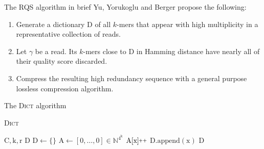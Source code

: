\documentclass[12pt]{beamer}
\newcommand{\pp}{\nolinebreak\hspace{-.05em}\raisebox{.4ex}{\tiny\bf +}\nolinebreak\raisebox{.4ex}{\tiny\bf +}\xspace}
\begin{document}
    \begin{frame}{The RQS algorithm in brief}
        Yu, Yorukoglu and Berger \cite{YYB14} propose the following:

        \vspace{0.25cm}

        \begin{enumerate}
            \item Generate a dictionary \(\text{D}\) of all \(k\)-mers that appear
                with high multiplicity in a representative collection of reads.
            \item Let \(\gamma\) be a read. Its \(k\)-mers close to \(\text{D}\) in
                Hamming distance have nearly all of their quality score discarded.
            \item Compress the resulting high redundancy sequence with a general
                purpose lossless compression algorithm.
        \end{enumerate}
    \end{frame}

    \begin{frame}{The \textsc{Dict} algorithm}
        \begin{algorithm}[H]
            \caption{\textsc{Dict}}
            \begin{algorithmic}[1]
                \REQUIRE \(\text{C}, \text{k}, \text{r}\)
                \ENSURE \(\text{D}\)
                \STATE \(\text{D} \leftarrow \{\}\)
                \STATE \(\text{A} \leftarrow [0,\dots,0] \in \mathbb{N}^{4^\text{k}}\)
                    \STATE \(\text{A}[\text{x}]\pp\)
                \ENDFOR
                        \STATE \(\text{D}.\text{append}(\text{x})\)
                    \ENDIF
                \ENDFOR
                \RETURN \(\text{D}\)
            \end{algorithmic}
        \end{algorithm}
    \end{frame}
\end{document}
